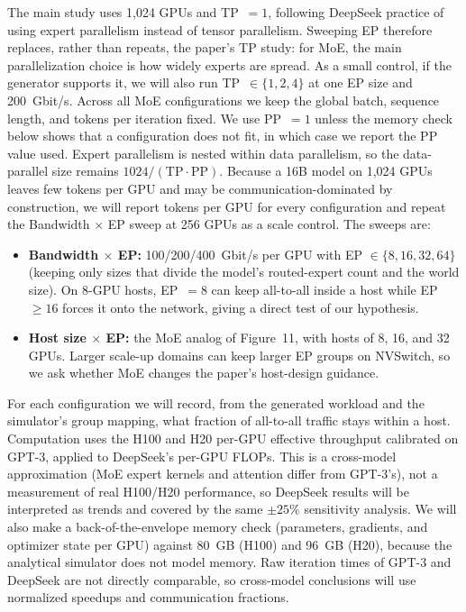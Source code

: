 \documentclass[letterpaper,twocolumn,10pt]{article}
\begin{document}
The main study uses 1,024 GPUs and TP~$=1$, following DeepSeek practice of using expert parallelism instead of tensor parallelism. Sweeping EP therefore replaces, rather than repeats, the paper's TP study: for MoE, the main parallelization choice is how widely experts are spread. As a small control, if the generator supports it, we will also run TP~$\in\{1,2,4\}$ at one EP size and 200~Gbit/s. Across all MoE configurations we keep the global batch, sequence length, and tokens per iteration fixed. We use PP~$=1$ unless the memory check below shows that a configuration does not fit, in which case we report the PP value used. Expert parallelism is nested within data parallelism, so the data-parallel size remains $1024/(\mathrm{TP}\cdot\mathrm{PP})$. Because a 16B model on 1,024 GPUs leaves few tokens per GPU and may be communication-dominated by construction, we will report tokens per GPU for every configuration and repeat the Bandwidth $\times$ EP sweep at 256 GPUs as a scale control. The sweeps are:
\begin{itemize}[leftmargin=*,itemsep=1pt,topsep=2pt]
\item \textbf{Bandwidth $\times$ EP:} 100/200/400~Gbit/s per GPU with EP $\in \{8, 16, 32, 64\}$ (keeping only sizes that divide the model's routed-expert count and the world size). On 8-GPU hosts, EP~$=8$ can keep all-to-all inside a host while EP~$\ge 16$ forces it onto the network, giving a direct test of our hypothesis.
\item \textbf{Host size $\times$ EP:} the MoE analog of Figure~11, with hosts of 8, 16, and 32 GPUs. Larger scale-up domains can keep larger EP groups on NVSwitch, so we ask whether MoE changes the paper's host-design guidance.
\end{itemize}
For each configuration we will record, from the generated workload and the simulator's group mapping, what fraction of all-to-all traffic stays within a host. Computation uses the H100 and H20 per-GPU effective throughput calibrated on GPT-3, applied to DeepSeek's per-GPU FLOPs. This is a cross-model approximation (MoE expert kernels and attention differ from GPT-3's), not a measurement of real H100/H20 performance, so DeepSeek results will be interpreted as trends and covered by the same $\pm25\%$ sensitivity analysis. We will also make a back-of-the-envelope memory check (parameters, gradients, and optimizer state per GPU) against 80~GB (H100) and 96~GB (H20), because the analytical simulator does not model memory. Raw iteration times of GPT-3 and DeepSeek are not directly comparable, so cross-model conclusions will use normalized speedups and communication fractions.
\end{document}
